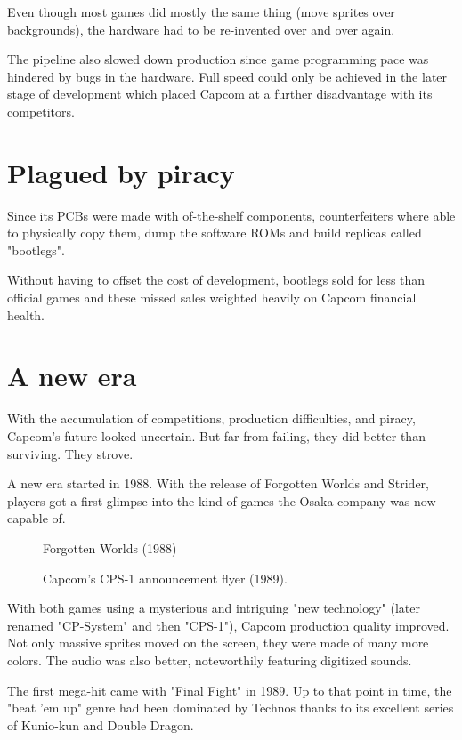 Even though most games did mostly the same thing (move sprites over backgrounds), the hardware had to be re-invented over and over again. 

The pipeline also slowed down production since game programming pace was hindered by bugs in the hardware. Full speed could only be achieved in the later stage of development which placed Capcom at a further disadvantage with its competitors.


\section{Plagued by piracy}
Since its PCBs were made with of-the-shelf components, counterfeiters where able to physically copy them, dump the software ROMs and build replicas called "bootlegs". 

Without having to offset the cost of development, bootlegs sold for less than official games and these missed sales weighted heavily on Capcom financial health. 

\section{A new era}
With the accumulation of competitions, production difficulties, and piracy, Capcom's future looked uncertain. But far from failing, they did better than surviving. They strove. 

A new era started in 1988. With the release of Forgotten Worlds and Strider, players got a first glimpse into the kind of games the Osaka company was now capable of.  



 \begin{figure}[H]
\caption*{Forgotten Worlds (1988)}
\end{figure}



 

  \begin{figure}[H]
  \caption*{Capcom's CPS-1 announcement flyer (1989).}
  \end{figure}

With both games using a mysterious and intriguing "new technology" (later renamed "CP-System" and then "CPS-1"), Capcom production quality improved. Not only massive sprites moved on the screen, they were made of many more colors. The audio was also better, noteworthily featuring digitized sounds.

The first mega-hit came with "Final Fight" in 1989. Up to that point in time, the "beat 'em up" genre had been dominated by Technos thanks to its excellent series of Kunio-kun and Double Dragon. 

